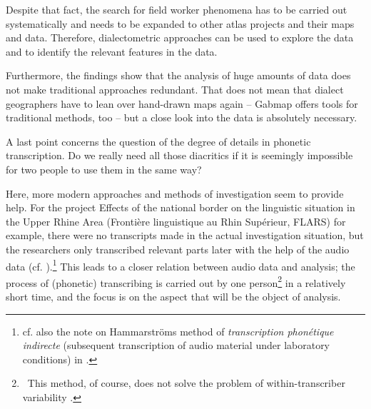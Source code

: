 \documentclass[output=paper]{LSP/langsci}
\begin{document}
Despite that fact, the search for field worker phenomena has to be carried out systematically and needs to be expanded to other atlas projects and their maps and data. Therefore, dialectometric approaches can be used to explore the data and to identify the relevant features in the data.

Furthermore, the findings show that the analysis of huge amounts of data does not make traditional approaches redundant. That does not mean that dialect geographers have to lean over hand-drawn maps again – Gabmap offers tools for {\textquotedbl}traditional{\textquotedbl} methods, too – but a close look into the data is absolutely necessary.

A last point concerns the question of the degree of details in phonetic transcription. Do we really need all those diacritics if it is seemingly impossible for two people to use them in the same way?

Here, more modern approaches and methods of investigation seem to provide help. For the project {\textquotedbl}Effects of the national border on the linguistic situation in the Upper Rhine Area{\textquotedbl} (Frontière linguistique au Rhin Supérieur, FLARS) for example, there were no transcripts made in the actual investigation situation, but the researchers only transcribed relevant parts later with the help of the audio data (cf. \citealt{auer_auswirkungen_2015}).\footnote{cf. also the note on Hammarström{\textquotesingle}s method of \textit{transcription phonétique indirecte} ({\textquotesingle}subsequent transcription of audio material under laboratory conditions{\textquotesingle}) in \citet[73]{hotzenkocherle_einfuhrung_1962}.} This leads to a closer relation between audio data and analysis; the process of (phonetic) transcribing is carried out by one person\footnote{\ This method, of course, does not solve the problem of {\textquotedbl}within-transcriber variability{\textquotedbl} \citep[258]{kerswill_limits_1990}.} in a relatively short time, and the focus is on the aspect that will be the object of analysis.

\printbibliography[heading=subbibliography,notkeyword=this]
\end{document}
